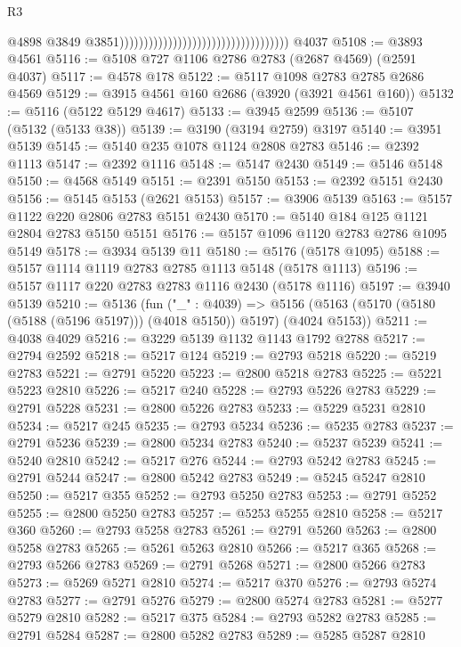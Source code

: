 \begin{lexlean}{R3}
\begin{coremodule}
                                                                          @4898
                                                                          @3849
                                                                          @3851)))))))))))))))))))))))))))))))))))
    @4037
@5108 := @3893 @4561
@5116 := @5108 @727 @1106 @2786 @2783 (@2687 @4569) (@2591 @4037)
@5117 := @4578 @178
@5122 := @5117 @1098 @2783 @2785 @2686 @4569
@5129 := @3915 @4561 @160 @2686 (@3920 (@3921 @4561 @160))
@5132 := @5116 (@5122 @5129 @4617)
@5133 := @3945 @2599
@5136 := @5107 (@5132 (@5133 @38))
@5139 := @3190 (@3194 @2759) @3197
@5140 := @3951 @5139
@5145 := @5140 @235 @1078 @1124 @2808 @2783
@5146 := @2392 @1113
@5147 := @2392 @1116
@5148 := @5147 @2430
@5149 := @5146 @5148
@5150 := @4568 @5149
@5151 := @2391 @5150
@5153 := @2392 @5151 @2430
@5156 := @5145 @5153 (@2621 @5153)
@5157 := @3906 @5139
@5163 := @5157 @1122 @220 @2806 @2783 @5151 @2430
@5170 := @5140 @184 @125 @1121 @2804 @2783 @5150 @5151
@5176 := @5157 @1096 @1120 @2783 @2786 @1095 @5149
@5178 := @3934 @5139 @11
@5180 := @5176 (@5178 @1095)
@5188 := @5157 @1114 @1119 @2783 @2785 @1113 @5148 (@5178 @1113)
@5196 := @5157 @1117 @220 @2783 @2783 @1116 @2430 (@5178 @1116)
@5197 := @3940 @5139
@5210 := @5136
    (fun ("_" : @4039) =>
    @5156 (@5163 (@5170 (@5180 (@5188 (@5196 @5197))) (@4018 @5150)) @5197) (@4024 @5153))
@5211 := @4038 @4029
@5216 := @3229 @5139 @1132 @1143 @1792 @2788
@5217 := @2794 @2592
@5218 := @5217 @124
@5219 := @2793 @5218
@5220 := @5219 @2783
@5221 := @2791 @5220
@5223 := @2800 @5218 @2783
@5225 := @5221 @5223 @2810
@5226 := @5217 @240
@5228 := @2793 @5226 @2783
@5229 := @2791 @5228
@5231 := @2800 @5226 @2783
@5233 := @5229 @5231 @2810
@5234 := @5217 @245
@5235 := @2793 @5234
@5236 := @5235 @2783
@5237 := @2791 @5236
@5239 := @2800 @5234 @2783
@5240 := @5237 @5239
@5241 := @5240 @2810
@5242 := @5217 @276
@5244 := @2793 @5242 @2783
@5245 := @2791 @5244
@5247 := @2800 @5242 @2783
@5249 := @5245 @5247 @2810
@5250 := @5217 @355
@5252 := @2793 @5250 @2783
@5253 := @2791 @5252
@5255 := @2800 @5250 @2783
@5257 := @5253 @5255 @2810
@5258 := @5217 @360
@5260 := @2793 @5258 @2783
@5261 := @2791 @5260
@5263 := @2800 @5258 @2783
@5265 := @5261 @5263 @2810
@5266 := @5217 @365
@5268 := @2793 @5266 @2783
@5269 := @2791 @5268
@5271 := @2800 @5266 @2783
@5273 := @5269 @5271 @2810
@5274 := @5217 @370
@5276 := @2793 @5274 @2783
@5277 := @2791 @5276
@5279 := @2800 @5274 @2783
@5281 := @5277 @5279 @2810
@5282 := @5217 @375
@5284 := @2793 @5282 @2783
@5285 := @2791 @5284
@5287 := @2800 @5282 @2783
@5289 := @5285 @5287 @2810

\end{coremodule}
\end{lexlean}
